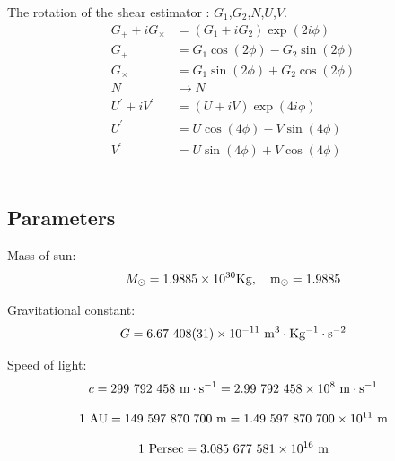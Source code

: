 \documentclass[12pt, a4paper]{article}
\begin{document}
The rotation of the shear estimator : $G_1$,$G_2$,$N$,$U$,$V$.
\begin{align} 
G_{+}+ iG_{\times} &= (G_1+iG_2) \exp (2i\phi) \\
G_{+} &= G_1\cos (2\phi)  - G_2\sin (2\phi) \\
G_{\times} &= G_1\sin (2\phi)  + G_2\cos (2\phi) \\
N &\rightarrow N \\
U^{\prime}+iV^{\prime} &= (U+iV)\exp (4i\phi) \\
U^{\prime} &= U\cos (4\phi)  - V\sin (4\phi) \\
V^{\prime} &= U\sin (4\phi)  + V\cos (4\phi) 
\end{align}
\\

\subsection{Parameters}
Mass of sun:
\begin{equation}
M_{\odot} = 1.9885 \times 10^{30} \rm{Kg},\quad m_{\odot} = 1.9885
\end{equation} 


Gravitational constant:
\begin{equation}
G = 6.67\  408(31) \times 10^{-11} \ \rm{m^3 \cdot Kg^{-1}\cdot s^{-2}}
\end{equation}

Speed of light:
\begin{equation}
c = 299\  792\  458 \ \rm{m\cdot s^{-1}} = 2.99\  792\  458 \times 10^8 \ \rm{m\cdot s^{-1}}
\end{equation} 

\begin{equation}
1\  \rm{AU} = 149\  597\  870\  700 \ \rm{m} = 1.49\   597\   870\   700 \times 10^{11} \ \rm{m}
\end{equation}

\begin{equation}
1 \ \rm{Persec} =  3.085\  677\  581 \times 10^{16} \ \rm{m}
\end{equation}
\end{document}
